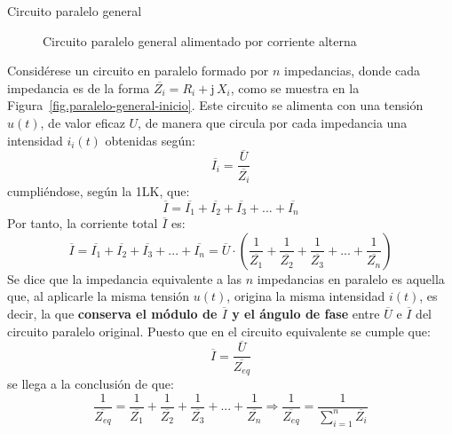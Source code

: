 \documentclass[11pt]{book} %
\makeatletter
\numberwithin{dummy}{section}
\theoremstyle{ocrenumbox}
\theoremstyle{blacknumex}
\theoremstyle{blacknumbox}
\theoremstyle{ocrenum}
\renewcommand{\subsection}{\@startsection {subsection}{2}{\z@}
{-3ex \@plus -0.1ex \@minus -.4ex}
{0.5ex \@plus.2ex }
{\normalfont\sffamily\bfseries}}
\makeatother
\begin{document}
	\subsection{Circuito paralelo general}
	\begin{figure}[tbp]
		\centering
		\hfil
		\caption{Circuito paralelo general alimentado por corriente alterna}
		\label{fig.paralelo-general}
	\end{figure}
	Considérese un circuito en paralelo formado por $n$ impedancias, donde cada impedancia es de la forma $\overline{Z_i}=R_i+\mathrm{j}\,X_i$, como se muestra en la Figura~\ref{fig.paralelo-general-inicio}. Este circuito se alimenta con una tensión $u(t)$, de valor eficaz $U$, de manera que circula por cada impedancia una intensidad $i_i(t)$ obtenidas según: 
	\begin{equation*}
		\overline{I_i}=\dfrac{\overline{U}}{\overline{Z_i}}
	\end{equation*}
	cumpliéndose, según la 1LK, que:
	\begin{equation*}
		\overline{I}=\overline{I_1}+\overline{I_2}+\overline{I_3}+...+\overline{I_n}
	\end{equation*}
	Por tanto, la corriente total $\overline{I}$ es:
	\begin{equation*}
		\overline{I}=\overline{I_1}+\overline{I_2}+\overline{I_3}+...+\overline{I_n}=\overline{U} \cdot\left(\dfrac{1}{\overline{Z_1}}+\dfrac{1}{\overline{Z_2}}+\dfrac{1}{\overline{Z_3}}+...+\dfrac{1}{\overline{Z_n}}\right)
	\end{equation*}
	Se dice que la impedancia equivalente a las $n$ impedancias en paralelo es aquella que, al aplicarle la misma tensión $u(t)$, origina la misma intensidad $i(t)$, es decir, la que \textbf{conserva el módulo de $\overline{I}$ y el ángulo de fase} entre $\overline{U}$ e $\overline{I}$ del circuito paralelo original. Puesto que en el circuito equivalente se cumple que: 
	\begin{equation*}
		\overline{I}=\dfrac{\overline{U}}{\overline{Z_{eq}}}
	\end{equation*}
	se llega a la conclusión de que:
	\begin{equation}
		\dfrac{1}{\overline{Z_{eq}}}=\dfrac{1}{\overline{Z_1}}+\dfrac{1}{\overline{Z_2}}+\dfrac{1}{\overline{Z_3}}+...+\dfrac{1}{\overline{Z_n}}\Rightarrow \boxed{\dfrac{1}{\overline{Z_{eq}}}=\dfrac{1}{\displaystyle\sum_{i=1}^n \overline{Z_i}}}
	\end{equation}
	
\end{document}
